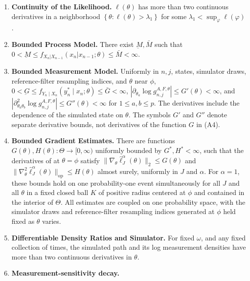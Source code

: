 \arxiv{}{\vspace*{-3ex}}
\begin{enumerate}[label=(A\arabic*),itemsep=-1ex, , font=\small] 
    \item \textbf{Continuity of the Likelihood.} $\ell(\theta)$ has more than two continuous derivatives in a neighborhood $\left\{\theta: \ell(\theta)>\lambda_1\right\}$ for some $\lambda_1<\sup _{\varphi} \ell(\varphi)$.\label{assump:conti-lik}
    \item \textbf{Bounded Process Model.} There exist $\underbar{M}, \bar{M}$ such that $0 < \underbar{M} \leq f_{X_n|X_{n-1}}(x_n | x_{n-1};\theta) \leq \bar{M} < \infty$.\label{assump:bounded-process}
    \item \textbf{Bounded Measurement Model.} Uniformly in $n,j$, states, simulator draws, reference-filter resampling indices, and $\theta$ near $\phi$,
    $0<\underbar G\leq f_{Y_n\mid X_n}(y_n^*\mid x_n;\theta)\leq\bar G<\infty$,
    $|\partial_{\theta_a}\log g_{n,j}^{A,F,\theta}|\leq G'(\theta)<\infty$, and
    $|\partial_{\theta_a\theta_b}^2\log g_{n,j}^{A,F,\theta}|\leq G''(\theta)<\infty$
    for $1\leq a,b\leq p$. The derivatives include the dependence of the simulated state on $\theta$.
    The symbols $G'$ and $G''$ denote separate derivative bounds,
    not derivatives of the function $G$ in (A4).\label{assump:bounded-measurement}
    \item \textbf{Bounded Gradient Estimates.} There are functions $G(\theta), H(\theta): \Theta \to [0,\infty)$ uniformly bounded by $G^*, H^*<\infty$, such that the derivatives of  at $\theta=\phi$ satisfy $\|\nabla_\theta\hat\ell_J^\alpha(\theta)\|_2\leq G(\theta)$ and $\|\nabla_\theta^2\hat\ell_J^\alpha(\theta)\|_{\mathrm{op}}\leq H(\theta)$ almost surely, uniformly in $J$ and $\alpha$. For $\alpha=1$, these bounds hold on one probability-one event simultaneously for all $J$ and all $\theta$ in a fixed closed ball $K$ of positive radius centered at $\phi$ and contained in the interior of $\Theta$. All estimates are coupled on one probability space, with the simulator draws and reference-filter resampling indices generated at $\phi$ held fixed as $\theta$ varies.\label{assump:local-bounded-derivative}
    \item \textbf{Differentiable Density Ratios and Simulator.} For fixed $\omega$, and any fixed collection of times, the simulated path and its log measurement densities have more than two continuous derivatives in $\theta$.\label{assump:diff-meas-and-sim}
\item{\textbf{Measurement-sensitivity decay.}}

\end{enumerate}
